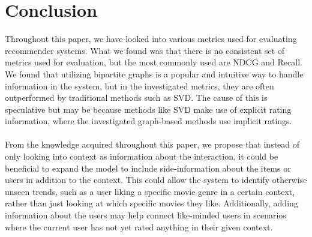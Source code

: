 \section{Conclusion}\label{sec:conclusion}
Throughout this paper, we have looked into various metrics used for evaluating recommender systems. What we found was that there is no consistent set of metrics used for evaluation, but the most commonly used are NDCG and Recall.
We found that utilizing bipartite graphs is a popular and intuitive way to handle information in the system, but in the investigated metrics, they are often outperformed by traditional methods such as SVD.
The cause of this is speculative but may be because methods like SVD make use of explicit rating information, where the investigated graph-based methods use implicit ratings.
\\\\
From the knowledge acquired throughout this paper, we propose that instead of only looking into context as information about the interaction, it could be beneficial to expand the model to include side-information about the items or users in addition to the context.
This could allow the system to identify otherwise unseen trends, such as a user liking a specific movie genre in a certain context, rather than just looking at which specific movies they like.
Additionally, adding information about the users may help connect like-minded users in scenarios where the current user has not yet rated anything in their given context.
